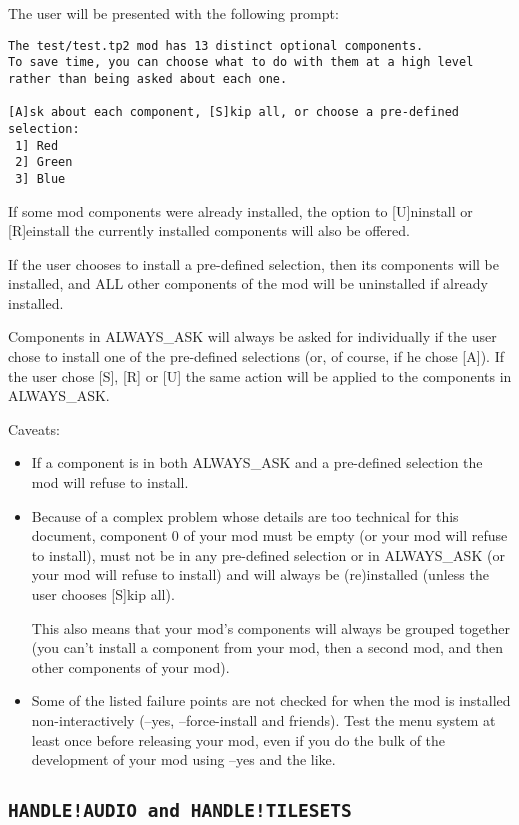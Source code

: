 \documentclass{article}
\begin{document}
The user will be presented with the following prompt:

\begin{verbatim}
The test/test.tp2 mod has 13 distinct optional components.
To save time, you can choose what to do with them at a high level rather than being asked about each one.

[A]sk about each component, [S]kip all, or choose a pre-defined selection:
 1] Red
 2] Green
 3] Blue
\end{verbatim}

If some mod components were already installed, the option to [U]ninstall
or [R]einstall the currently installed components will also be offered.

If the user chooses to install a pre-defined selection, then its components
will be installed, and ALL other components of the mod will be uninstalled
if already installed.

Components in ALWAYS_ASK will always be asked for individually if the user
chose to install one of the pre-defined selections (or, of course, if he chose
[A]). If the user chose [S], [R] or [U] the same action will be applied to the
components in ALWAYS_ASK.

Caveats:
\begin{itemize}
\item If a component is in both ALWAYS_ASK and a pre-defined selection the mod
will refuse to install.
\item Because of a complex problem whose details are too technical for this
document, component 0 of your mod must be empty (or your mod will refuse to
install), must not be in any pre-defined selection or in ALWAYS_ASK (or your
mod will refuse to install) and will always be (re)installed (unless the user
chooses [S]kip all).

This also means that your mod's components will always be grouped together (you
can't install a component from your mod, then a second mod, and then other
components of your mod).
\item Some of the listed failure points are not checked for when the mod is
installed non-interactively (--yes, --force-install and friends). Test the menu
system at least once before releasing your mod, even if you do the bulk of the
development of your mod using --yes and the like.
\end{itemize}

\label{sec-handle-audio-and-handle-tilesets}\subsection{\tt{HANDLE!AUDIO} and \tt{HANDLE!TILESETS}}
\end{document}
